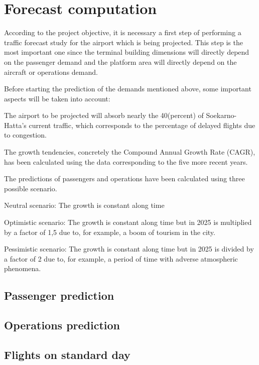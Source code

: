\section{Forecast computation}
According to the project objective, it is necessary a first step of performing a traffic forecast study for the airport which is being projected. This step is the most important one since the terminal building dimensions will directly depend on the passenger demand and the platform area will directly depend on the aircraft or operations demand.

Before starting the prediction of the demands mentioned above, some important aspects will be taken into account:

The airport to be projected will absorb nearly the 40(percent) of Soekarno-Hatta’s current traffic, which corresponds to the percentage of delayed flights due to congestion.

The growth tendencies, concretely the Compound Annual Growth Rate (CAGR), has been calculated using the data corresponding to the five more recent years.

The predictions of passengers and operations have been calculated using three possible scenario.

Neutral scenario: The growth is constant along time

Optimistic scenario: The growth is constant along time but in 2025 is multiplied by a factor of 1,5 due to, for example, a boom of tourism in the city.

Pessimistic scenario: The growth is constant along time but in 2025 is divided by a factor of 2 due to, for example, a period of time with adverse atmospheric phenomena.



	\subsection{Passenger prediction}
	\subsection{Operations prediction}
	\subsection{Flights on standard day}